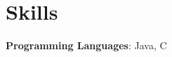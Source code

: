 \section{Skills}
 \begin{itemize}[leftmargin=0.15in, label={}]
    \small{\item{
     \textbf{Programming Languages}{: Java, C} \\
    }}
 \end{itemize}
